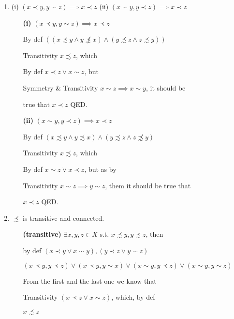 \documentclass{article}
\begin{document}
\begin{enumerate}
\item (i) $(x\prec y, y\sim z)\implies x\prec z$ (ii) $(x\sim y, y\prec z)\implies
x\prec z$
\begin{enumerate}
\item[\bf (i)] $(x\prec y, y\sim z)\implies x\prec z$
\item[By def] $((x\precsim y \wedge y\not\precsim x)\wedge (y\precsim z \wedge 
z\precsim y))$
\item[Transitivity] $x\precsim z$, which 
\item[By def] $x\prec z \vee x\sim z$, but
\item[Symmetry \& Transitivity] $x\sim z\implies x\sim y$, it should be
\item[] true that $x\prec z$ QED.
\item[]
\item[\bf (ii)] $(x\sim y, y\prec z)\implies x\prec z$
\item[By def] $(x\precsim y \wedge y\precsim x) \wedge (y\precsim z\wedge
z\not\precsim y)$
\item[Transitivity] $x\precsim z$, which
\item[By def] $x\sim z \vee x\prec z$, but as by
\item[Transitivity] $x\sim z\implies y\sim z$, them it should be true that
\item[] $x\prec z$ QED.
\end{enumerate}

\item $\precsim$ is transitive and connected.

\begin{enumerate}
\item[\bf (transitive)]  $\exists x,y,z\in X$ s.t. $x\precsim y, y\precsim z$, then
\item[by def] $(x\prec y \vee x\sim y),(y\prec z \vee y\sim z)$
\item[] $(x\prec y, y\prec z) \vee (x\prec y,y\sim x)\vee(x\sim y, y\prec z) \vee (x\sim y, y\sim z)$
\item[] From the first and the last one we know that
\item[Transitivity] $(x\prec z \vee x\sim z)$, which, by def
\item[] $x\precsim z$
\end{enumerate}
\end{enumerate}
\end{document}
